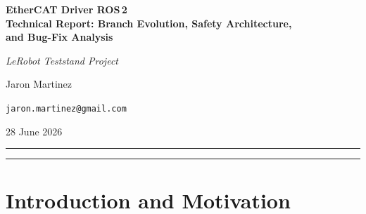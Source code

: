\documentclass[11pt,a4paper]{article}
\begin{document}
\begin{titlepage}
  \centering
  \vspace*{2cm}
  {\Huge\bfseries EtherCAT Driver ROS\,2\\[0.4em]
   \Large Technical Report: Branch Evolution, Safety Architecture,\\
   and Bug-Fix Analysis\par}
  \vspace{1.5cm}
  {\large\itshape LeRobot Teststand Project\par}
  \vspace{0.5cm}
  {\large Jaron Martinez\par}
  \vspace{0.5cm}
  {\large\texttt{jaron.martinez@gmail.com}\par}
  \vspace{1cm}
  {\large 28 June 2026\par}
  \vspace{2cm}
  \hrule
  \vspace{1em}
  \begin{abstract}
    \noindent
    This report documents the full technical evolution of the
    \texttt{ethercat\_driver\_ros2} fork developed for Synapticon Circulo
    servo drives (CiA402) controlled via an IgH EtherCAT Master and a
    Beckhoff CU1228 coupler in a LeRobot robotic-arm teststand.
    Starting from the upstream \texttt{main} branch of ICube-Robotics,
    two major feature branches were created:
    \texttt{saftey\_features\_clean} (immediate safety stop on link or
    working-counter fault) and \texttt{deterministic-barrier-startup}
    (deterministic Distributed-Clock synchronisation and a group
    barrier that eliminates serial per-joint initialisation delays).
    The report covers the motivation for each change, the precise code
    modifications made, and a rigorous analysis of eleven bugs
    discovered and fixed in the barrier-startup branch, including three
    IEEE\,754 NaN-safety issues.  A commissioning and test plan
    concludes the document.
  \end{abstract}
  \hrule
  \vspace{1em}
  \tableofcontents
\end{titlepage}

\newpage
\section{Introduction and Motivation}
\label{sec:intro}
\end{document}
